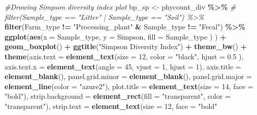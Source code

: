 \documentclass[
]{article}
\newenvironment{Shaded}{\begin{snugshade}}{\end{snugshade}}
\newcommand{\AttributeTok}[1]{\textcolor[rgb]{0.13,0.29,0.53}{#1}}
\newcommand{\CommentTok}[1]{\textcolor[rgb]{0.56,0.35,0.01}{\textit{#1}}}
\newcommand{\DecValTok}[1]{\textcolor[rgb]{0.00,0.00,0.81}{#1}}
\newcommand{\FloatTok}[1]{\textcolor[rgb]{0.00,0.00,0.81}{#1}}
\newcommand{\FunctionTok}[1]{\textcolor[rgb]{0.13,0.29,0.53}{\textbf{#1}}}
\newcommand{\NormalTok}[1]{#1}
\newcommand{\OtherTok}[1]{\textcolor[rgb]{0.56,0.35,0.01}{#1}}
\newcommand{\SpecialCharTok}[1]{\textcolor[rgb]{0.81,0.36,0.00}{\textbf{#1}}}
\newcommand{\StringTok}[1]{\textcolor[rgb]{0.31,0.60,0.02}{#1}}
\begin{document}
\begin{Shaded}
\begin{Highlighting}[]
\CommentTok{\#Drawing Simpson diversity index plot}
\NormalTok{bp\_sp }\OtherTok{\textless{}{-}} 
\NormalTok{  phycount\_div }\SpecialCharTok{\%\textgreater{}\%}
  \CommentTok{\# filter(Sample\_type == "Litter" | Sample\_type == "Soil") \%\textgreater{}\%}
  \FunctionTok{filter}\NormalTok{(Farm\_type }\SpecialCharTok{!=} \StringTok{"Processing\_plant"} \SpecialCharTok{\&}\NormalTok{ Sample\_type }\SpecialCharTok{!=} \StringTok{"Fecal"}\NormalTok{) }\SpecialCharTok{\%\textgreater{}\%}
  \FunctionTok{ggplot}\NormalTok{(}\FunctionTok{aes}\NormalTok{(}\AttributeTok{x =}\NormalTok{ Sample\_type,}
             \AttributeTok{y =}\NormalTok{ Simpson, }
             \AttributeTok{fill =}\NormalTok{ Sample\_type}
\NormalTok{                    )}
\NormalTok{                ) }\SpecialCharTok{+}
  \FunctionTok{geom\_boxplot}\NormalTok{() }\SpecialCharTok{+}
  \FunctionTok{ggtitle}\NormalTok{(}\StringTok{"Simpson Diversity Index"}\NormalTok{) }\SpecialCharTok{+}
  \FunctionTok{theme\_bw}\NormalTok{() }\SpecialCharTok{+}
  \FunctionTok{theme}\NormalTok{(}\AttributeTok{axis.text =} \FunctionTok{element\_text}\NormalTok{(}\AttributeTok{size =} \DecValTok{12}\NormalTok{, }
                                 \AttributeTok{color =} \StringTok{"black"}\NormalTok{, }
                                 \AttributeTok{hjust =} \FloatTok{0.5}
\NormalTok{                                   ),}
        \AttributeTok{axis.text.x =} \FunctionTok{element\_text}\NormalTok{(}\AttributeTok{angle =} \DecValTok{45}\NormalTok{,}
                                   \AttributeTok{vjust =} \DecValTok{1}\NormalTok{,}
                                   \AttributeTok{hjust =} \DecValTok{1}\NormalTok{),}
        \AttributeTok{axis.title =} \FunctionTok{element\_blank}\NormalTok{(),}
        \AttributeTok{panel.grid.minor =} \FunctionTok{element\_blank}\NormalTok{(),}
        \AttributeTok{panel.grid.major =} \FunctionTok{element\_line}\NormalTok{(}\AttributeTok{color =} \StringTok{"azure2"}\NormalTok{),}
        \AttributeTok{plot.title =} \FunctionTok{element\_text}\NormalTok{(}\AttributeTok{size =} \DecValTok{14}\NormalTok{, }\AttributeTok{face =} \StringTok{"bold"}\NormalTok{),}
        \AttributeTok{strip.background =} \FunctionTok{element\_rect}\NormalTok{(}\AttributeTok{fill =} \StringTok{"transparent"}\NormalTok{,}
                                        \AttributeTok{color =} \StringTok{"transparent"}\NormalTok{),}
        \AttributeTok{strip.text =} \FunctionTok{element\_text}\NormalTok{(}\AttributeTok{size =} \DecValTok{12}\NormalTok{,}
                                  \AttributeTok{face =} \StringTok{"bold"}

\end{Highlighting}
\end{Shaded}
\end{document}
